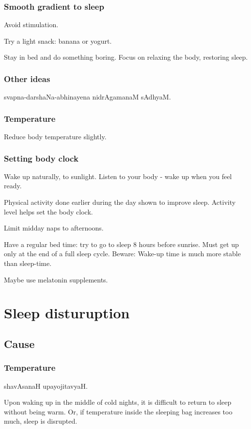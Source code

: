 \documentclass[oneside, article]{memoir}
\begin{document}
\subsubsection{Smooth gradient to sleep}
Avoid stimulation.

Try a light snack: banana or yogurt.

Stay in bed and do something boring. Focus on relaxing the body, restoring sleep.

\subsubsection{Other ideas}
svapna-darshaNa-abhinayena nidrAgamanaM sAdhyaM.

\subsubsection{Temperature}
Reduce body temperature slightly.

\subsubsection{Setting body clock}
Wake up naturally, to sunlight. Listen to your body - wake up when you feel ready.

Physical activity done earlier during the day shown to improve sleep. Activity level helps set the body clock.

Limit midday naps to afternoons.

Have a regular bed time: try to go to sleep 8 hours before sunrise.  Must get up only at the end of a full sleep cycle. Beware: Wake-up time is much more stable than sleep-time.

Maybe use melatonin supplements.

\section{Sleep disturuption}
\subsection{Cause}
\subsubsection{Temperature}
shavAsanaH upayojitavyaH.

Upon waking up in the middle of cold nights, it is difficult to return to sleep without being warm. Or, if temperature inside the sleeping bag increases too much, sleep is disrupted.
\end{document}
